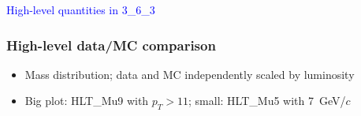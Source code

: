 \documentclass[compress]{beamer}
\begin{document}
\begin{frame}
\begin{center}
\Huge \textcolor{blue}{High-level quantities in 3\_6\_3}
\end{center}
\end{frame}

\begin{frame}
\frametitle{High-level data/MC comparison}
\begin{itemize}
\item Mass distribution; data and MC independently scaled by luminosity
\item Big plot: HLT\_Mu9 with $p_T > 11$; small: HLT\_Mu5 with 7~GeV/$c$
\end{itemize}

\vspace{1.5 cm}
\hfill {}


\end{frame}
\end{document}

